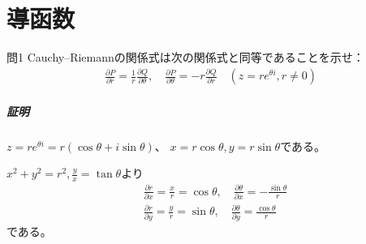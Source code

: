 \chapter{導函数}%

\begin{mysimplebox}{問1}
    Cauchy--Riemannの関係式は次の関係式と同等であることを示せ：
    \begin{align*}
        \frac{\partial P}{\partial r}
        =\frac{1}{r}\frac{\partial Q}{\partial \theta},\quad
        \frac{\partial P}{\partial \theta}
        =-r\frac{\partial Q}{\partial r}\quad
        (z=re^{\theta i},r\neq0)
    \end{align*}
\end{mysimplebox}
\paragraph{証明}
$z=re^{\theta i}=r(\cos\theta+i\sin\theta)$、
$x=r\cos\theta,y=r\sin\theta$である。

$x^2+y^2=r^2, \frac{y}{x}=\tan\theta$より
\begin{align*}
    &\frac{\partial r}{\partial x}=\frac{x}{r}=\cos\theta,\quad
    \frac{\partial \theta}{\partial x}=-\frac{\sin\theta}{r}\\
    &\frac{\partial r}{\partial y}=\frac{y}{r}=\sin\theta,\quad
    \frac{\partial \theta}{\partial y}=\frac{\cos\theta}{r}
\end{align*}
である。

